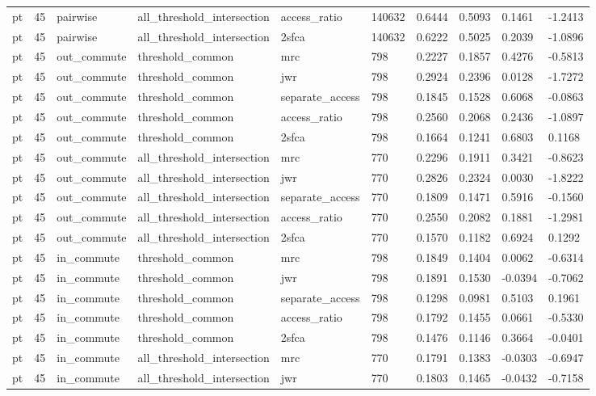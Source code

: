 \begin{table}[htbp]
\begin{tabular}{llllllllll}
pt & 45 & pairwise & all\_threshold\_intersection & access\_ratio & 140632 & 0.6444 & 0.5093 & 0.1461 & -1.2413 \\
pt & 45 & pairwise & all\_threshold\_intersection & 2sfca & 140632 & 0.6222 & 0.5025 & 0.2039 & -1.0896 \\
pt & 45 & out\_commute & threshold\_common & mrc & 798 & 0.2227 & 0.1857 & 0.4276 & -0.5813 \\
pt & 45 & out\_commute & threshold\_common & jwr & 798 & 0.2924 & 0.2396 & 0.0128 & -1.7272 \\
pt & 45 & out\_commute & threshold\_common & separate\_access & 798 & 0.1845 & 0.1528 & 0.6068 & -0.0863 \\
pt & 45 & out\_commute & threshold\_common & access\_ratio & 798 & 0.2560 & 0.2068 & 0.2436 & -1.0897 \\
pt & 45 & out\_commute & threshold\_common & 2sfca & 798 & 0.1664 & 0.1241 & 0.6803 & 0.1168 \\
pt & 45 & out\_commute & all\_threshold\_intersection & mrc & 770 & 0.2296 & 0.1911 & 0.3421 & -0.8623 \\
pt & 45 & out\_commute & all\_threshold\_intersection & jwr & 770 & 0.2826 & 0.2324 & 0.0030 & -1.8222 \\
pt & 45 & out\_commute & all\_threshold\_intersection & separate\_access & 770 & 0.1809 & 0.1471 & 0.5916 & -0.1560 \\
pt & 45 & out\_commute & all\_threshold\_intersection & access\_ratio & 770 & 0.2550 & 0.2082 & 0.1881 & -1.2981 \\
pt & 45 & out\_commute & all\_threshold\_intersection & 2sfca & 770 & 0.1570 & 0.1182 & 0.6924 & 0.1292 \\
pt & 45 & in\_commute & threshold\_common & mrc & 798 & 0.1849 & 0.1404 & 0.0062 & -0.6314 \\
pt & 45 & in\_commute & threshold\_common & jwr & 798 & 0.1891 & 0.1530 & -0.0394 & -0.7062 \\
pt & 45 & in\_commute & threshold\_common & separate\_access & 798 & 0.1298 & 0.0981 & 0.5103 & 0.1961 \\
pt & 45 & in\_commute & threshold\_common & access\_ratio & 798 & 0.1792 & 0.1455 & 0.0661 & -0.5330 \\
pt & 45 & in\_commute & threshold\_common & 2sfca & 798 & 0.1476 & 0.1146 & 0.3664 & -0.0401 \\
pt & 45 & in\_commute & all\_threshold\_intersection & mrc & 770 & 0.1791 & 0.1383 & -0.0303 & -0.6947 \\
pt & 45 & in\_commute & all\_threshold\_intersection & jwr & 770 & 0.1803 & 0.1465 & -0.0432 & -0.7158 \\

\end{tabular}
\end{table}
